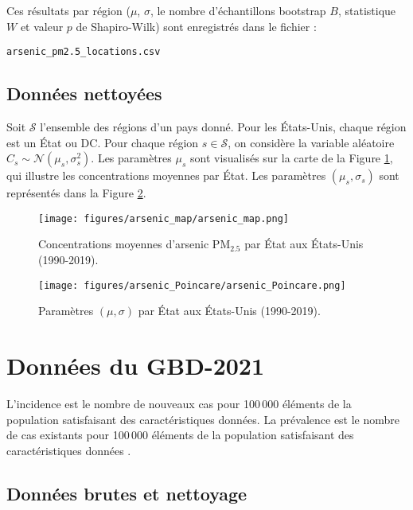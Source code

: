 Ces résultats par région ($\mu$, $\sigma$, le nombre d'échantillons bootstrap $B$, statistique $W$ et valeur $p$ de Shapiro-Wilk) sont enregistrés dans le fichier :
\begin{center}
	\texttt{arsenic\_pm2.5\_locations.csv}
\end{center}

\subsection{Données nettoyées}

Soit $\mathcal{S}$ l'ensemble des régions d'un pays donné. Pour les États-Unis, chaque région est un État ou DC. Pour chaque région $s \in \mathcal{S}$, on considère la variable aléatoire $C_s \sim \mathcal{N}(\mu_s, \sigma_s^2)$. Les paramètres $\mu_s$ sont visualisés sur la carte de la Figure \ref{fig:arsenic-map}, qui illustre les concentrations moyennes par État. Les paramètres $(\mu_s, \sigma_s)$ sont représentés dans la Figure \ref{fig:arsenic_Poincare}.

\begin{figure}[H]
	\centering
	\texttt{[image: figures/arsenic\_map/arsenic\_map.png]}
	\caption{Concentrations moyennes d'arsenic PM$_{2.5}$ par État aux États-Unis (1990-2019).}
	\label{fig:arsenic-map}
\end{figure}

\begin{figure}[H]
	\centering
	\texttt{[image: figures/arsenic\_Poincare/arsenic\_Poincare.png]}
	\caption{Paramètres $(\mu, \sigma)$ par État aux États-Unis (1990-2019).}
	\label{fig:arsenic_Poincare}
\end{figure}

\section{Données du GBD-2021}
\label{sec:gbd}

L'incidence est le nombre de nouveaux cas pour 100\,000 éléments de la population satisfaisant des caractéristiques données. La prévalence est le nombre de cas existants pour 100\,000 éléments de la population satisfaisant des caractéristiques données \citep{rothman2024epidemiology, kleinbaum1991epidemiologic}.

\subsection{Données brutes et nettoyage}

